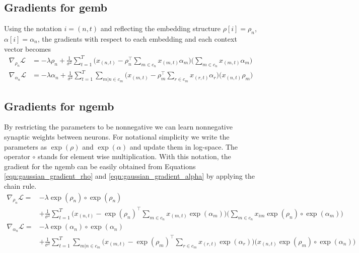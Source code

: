 \documentclass[12pt]{article}
\begin{document}
\subsection{Gradients for \gls{gemb}}
Using the notation $i = (n,t)$ and reflecting the embedding structure $\rho[i]=\rho_n$, $\alpha[i]=\alpha_n$, the gradients with respect to each embedding and each context vector becomes
 \label{sec:gaussian_gradients}
\begin{align}
\label{eqn:gaussian_gradient_rho}
\nabla_{\rho_n}\mathcal{L} &=- \lambda \rho_n + \frac{1}{\sigma^2} \sum_{t=1}^T \big(x_{(n,t)} - \rho_n^\top \sum_{m \in c_n} x_{(m,t)}\alpha_{m}\big)\big(\sum_{m \in c_n} x_{(m,t)}\alpha_{m}\big) \\
\label{eqn:gaussian_gradient_alpha}
\nabla_{\alpha_n}\mathcal{L} &=- \lambda \alpha_n + \frac{1}{\sigma^2} \sum_{t=1}^T \sum_{m |n \in c_m} \big(x_{(m,t)} - \rho_{m}^\top \sum_{r \in c_m} x_{(r,t)}\alpha_{r}\big)\big( x_{(n,t)}\rho_{m}\big) 
\end{align}
\subsection{Gradients for \gls{ngemb}}
 \label{sec:lognormal_gradients}
By restricting the parameters to be nonnegative we can learn nonnegative synaptic weights between neurons.
For notational simplicity we write the parameters as $\exp(\rho)$ and $\exp(\alpha)$ and update them in log-space. The operator $\circ$ stands for element wise multiplication. With this notation, the gradient for the \gls{ngemb} can be easily obtained from Equations \ref{eqn:gaussian_gradient_rho} and \ref{eqn:gaussian_gradient_alpha} by applying the chain rule.
\begin{align}
\label{eqn:nonnegative_gradient_rho}
\nabla_{\rho_n}\mathcal{L} =&- \lambda \exp(\rho_n)\circ \exp(\rho_n)\\
&+ \frac{1}{\sigma^2} \sum_{t=1}^T \big(x_{(n,t)} - \exp(\rho_n)^\top \sum_{m \in c_n} x_{(m,t)}\exp(\alpha_{m})\big)\big(\sum_{m \in c_n} x_{im}\exp(\rho_{n})\circ\exp(\alpha_{m}) \big)\nonumber \\
\label{eqn:nonnegative_gradient_alpha}
\nabla_{\alpha_n}\mathcal{L} =&- \lambda \exp(\alpha_{n})\circ\exp(\alpha_n) \\
&+ \frac{1}{\sigma^2} \sum_{t=1}^T \sum_{m |n \in c_m} \big(x_{(m,t)} - \exp(\rho_{m})^\top \sum_{r \in c_m} x_{(r,t)}\exp(\alpha_{r})\big)\big( x_{(n,t)}\exp(\rho_{m})\circ\exp(\alpha_{n})\big) \nonumber
\end{align}
\end{document}

